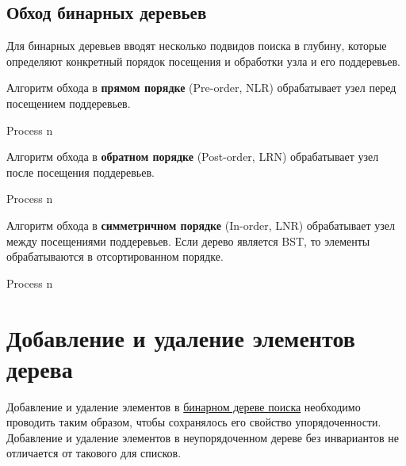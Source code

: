 \subsection{Обход бинарных деревьев}
\label{sec:bintree-traversal}
Для бинарных деревьев вводят несколько подвидов поиска в глубину,
которые определяют конкретный порядок посещения и обработки узла и его поддеревьев.

Алгоритм обхода в \textbf{прямом порядке} (Pre-order, NLR) обрабатывает узел перед
посещением поддеревьев.
\begin{algorithmic}
    \State Process n
      \State {}
    \EndIf
      \State {}
    \EndIf
  \EndFunction
\end{algorithmic}

Алгоритм обхода в \textbf{обратном порядке} (Post-order, LRN) обрабатывает узел после
посещения поддеревьев.
\begin{algorithmic}
      \State {}
    \EndIf
      \State {}
    \EndIf
    \State Process n
  \EndFunction
\end{algorithmic}

Алгоритм обхода в \textbf{симметричном порядке} (In-order, LNR) обрабатывает узел между
посещениями поддеревьев. Если дерево является BST, то элементы обрабатываются в отсортированном
порядке.
\begin{algorithmic}
      \State {}
    \EndIf
    \State Process n
      \State {}
    \EndIf
  \EndFunction
\end{algorithmic}

\section{Добавление и удаление элементов дерева}
\label{sec:tree-ins-del}
Добавление и удаление элементов в \hyperref[def:bst]{бинарном дереве поиска} необходимо проводить таким образом,
чтобы сохранялось его свойство упорядоченности. Добавление и удаление элементов в неупорядоченном дереве без
инвариантов не отличается от такового для списков.

